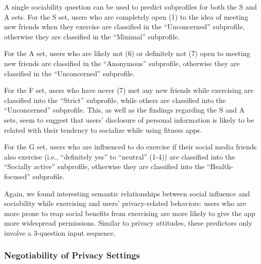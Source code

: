 %	



A single sociability question can be used to predict subprofiles for both the S and A sets. For the S set, users who are completely open (1) to the idea of meeting new friends when they exercise are classified in the ``Unconcerned'' subprofile, otherwise they are classified in the ``Minimal'' subprofile.

For the A set, users who are likely not (6) or definitely not (7) open to meeting new friends are classified in the ``Anonymous'' subprofile, otherwise they are classified in the ``Unconcerned'' subprofile.

For the F set, users who have never (7) met any new friends while exercising are classified into the ``Strict'' subprofile, while others are classified into the ``Unconcerned'' subprofile. This, as well as the findings regarding the S and A sets, seem to suggest that users'  disclosure of personal information is likely to be related with their tendency to socialize while using fitness apps.

For the G set, users who are influenced to do exercise if their social media friends also exercise (i.e., ``definitely yes'' to ``neutral'' (1-4)) are classified into the ``Socially active'' subprofile, otherwise they are classified into the ``Health-focused'' subprofile.

Again, we found interesting semantic relationships between social influence and sociability while exercising and users' privacy-related behaviors: users who are more prone to reap social benefits from exercising are more likely to give the app more widespread permissions. Similar to privacy attitudes, these predictors only involve a 3-question input sequence.


\subsubsection{Negotiability of Privacy Settings}

